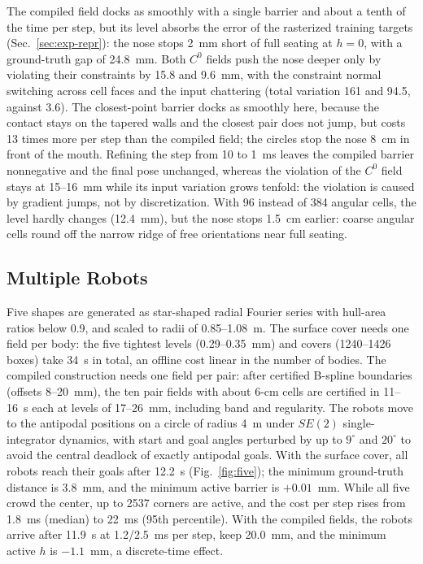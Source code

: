 \documentclass[journal]{IEEEtran}
\theoremstyle{definition}
\begin{document}
The compiled field docks as smoothly with a single barrier and about a tenth of the time per step,
but its level absorbs the error of the rasterized training targets (Sec.~\ref{sec:exp-repr}): the nose
stops 2~mm short of full seating at $h=0$, with a ground-truth gap of 24.8~mm. Both $C^0$
fields push the nose deeper only by violating their constraints by 15.8 and 9.6~mm, with the
constraint normal switching across cell faces and the input chattering (total variation 161 and
94.5, against 3.6). The closest-point barrier docks as smoothly here, because the contact stays on
the tapered walls and the closest pair does not jump, but costs 13 times more per step than the
compiled field; the circles stop the nose 8~cm in front of the mouth. Refining the step from 10 to 1~ms leaves the compiled barrier
nonnegative and the final pose unchanged, whereas the violation of the $C^0$ field stays at
15--16~mm while its input variation grows tenfold: the violation is caused by gradient jumps, not
by discretization. With 96 instead of 384 angular cells, the level hardly changes (12.4~mm), but the
nose stops 1.5~cm earlier: coarse angular cells round off the narrow ridge of free orientations near
full seating.

\subsection{Multiple Robots}\label{sec:exp-five}
Five shapes are generated as star-shaped radial Fourier series with hull-area ratios below 0.9,
and scaled to radii of 0.85--1.08~m. The surface cover needs one field per body: the five
tightest levels (0.29--0.35~mm) and covers (1240--1426 boxes) take 34~s in total, an offline cost
linear in the number of bodies. The compiled construction needs one field per pair: after certified
B-spline boundaries (offsets 8--20~mm), the ten pair fields with about 6-cm cells are certified in
11--16~s each at levels of 17--26~mm, including band and regularity. The robots move to the
antipodal positions on a circle of radius 4~m under $SE(2)$ single-integrator dynamics, with start
and goal angles perturbed by up to $9^\circ$ and $20^\circ$ to avoid the central deadlock of exactly
antipodal goals. With the surface cover, all robots reach their goals after 12.2~s
(Fig.~\ref{fig:five}); the minimum ground-truth distance is 3.8~mm, and the minimum active barrier is
$+0.01$~mm. While all five crowd the center, up to 2537 corners are active, and the cost per step
rises from 1.8~ms (median) to 22~ms (95th percentile). With the compiled fields, the robots arrive
after 11.9~s at 1.2/2.5~ms per step, keep 20.0~mm, and the minimum active $h$ is $-1.1$~mm, a
discrete-time effect.
\end{document}

